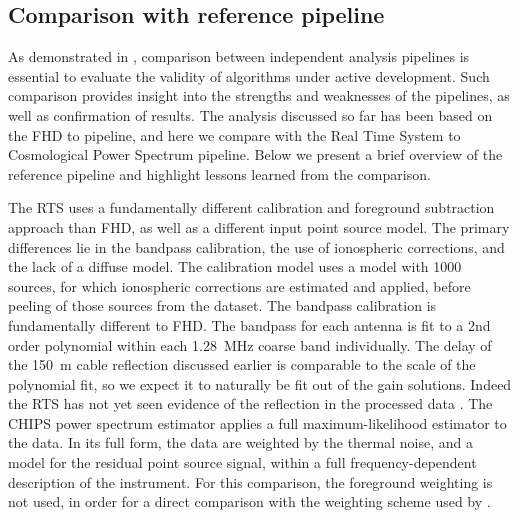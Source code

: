 \documentclass[iop]{emulateapj}
\begin{document}
\subsection{Comparison with reference pipeline}\label{subsec:ref_pipe}

As demonstrated in \citealt{Jacobs:2016}, comparison between independent 
analysis pipelines is essential to evaluate the validity of algorithms under active development. 
Such comparison provides insight into the strengths and weaknesses of the pipelines, as well 
as confirmation of results. The analysis discussed so far has been based on the FHD to 
\eppsilon pipeline, and here we compare with the Real Time System \citep[RTS,][]
{Mitchell:2008,Ord:2010} to Cosmological  Power Spectrum \citep[CHIPS,][]
{Trott:2016} pipeline. Below we present a brief overview of the reference pipeline and 
highlight lessons learned from the comparison.

The RTS uses a fundamentally different calibration and foreground subtraction approach than 
FHD, as well as a different input point source model. The primary differences lie in the 
bandpass calibration, the use of ionospheric corrections, and the lack of a diffuse model. The 
calibration model uses a model with 1000 sources, for which ionospheric corrections are 
estimated and applied, before peeling of those sources from the dataset. The bandpass 
calibration is fundamentally different to FHD.
The bandpass for each antenna is fit to a 2nd order polynomial within each 1.28~MHz coarse 
band individually. The delay of the 150~m cable reflection discussed earlier is comparable
to the scale of the polynomial fit, so we expect it to naturally be fit out of the gain
solutions. Indeed the RTS has not yet seen evidence of the reflection in the processed
data \citep{Jacobs:2016}.
The CHIPS power 
spectrum estimator applies a full maximum-likelihood estimator to the data. In its full form, the 
data are weighted by the thermal noise, and a model for the residual point source signal, 
within a full frequency-dependent description of the instrument. For this comparison, the 
foreground weighting is not used, in order for a direct comparison with the weighting scheme 
used by \eppsilon.
\end{document}
